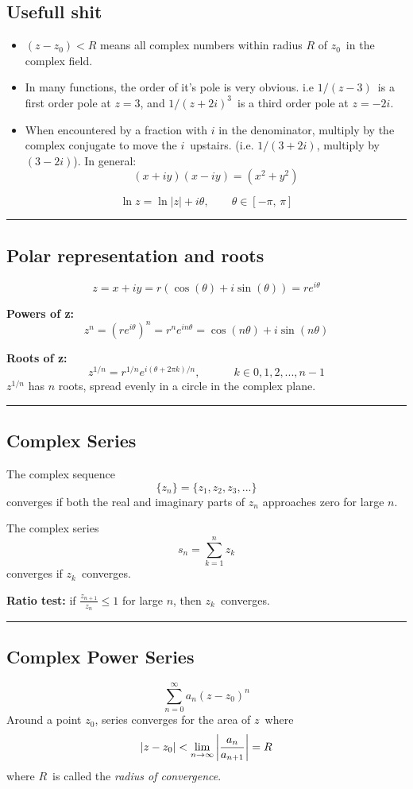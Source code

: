 \documentclass[10pt,a4paper]{article}
\renewcommand{\exp}{e^}
\newcommand{\holine}{\rule{286pt}{1pt}}
\begin{document}
\begin{multicols}{2}
\subsection*{Usefull shit}

\begin{itemize}
    \item $(z-z_0)<R$ means all complex numbers within radius $R$ of $z_0$ in the complex field.
    \item In many functions, the order of it's pole is very obvious. i.e $1/(z-3)$ is a first order pole at $z=3$, and $1/(z+2i)^3$ is a third order pole at $z=-2i$.
    \item When encountered by a fraction with $i$ in the denominator, multiply by the complex conjugate to move the $i$ upstairs. (i.e. $1/(3+2i)$, multiply by $(3-2i)$). In general:
    \[
        (x+iy)(x-iy) = (x^2 + y^2)
    \]
\end{itemize}

\[
    \ln{z} = \ln|z| + i\theta, \quad\quad \theta\in[-\pi,\, \pi]
\]



\holine
\subsection*{Polar representation and roots}
\[
    z = x + iy = r(\cos(\theta) + i\sin(\theta)) = r\exp{i\theta}
\]

\textbf{Powers of z:}
\[
    z^n = (r\exp{i\theta})^n = r^n\exp{in\theta} = \cos(n\theta) + i \sin(n\theta)
\]

\textbf{Roots of z:} 
\[
    z^{1/n} = r^{1/n}\exp{i(\theta + 2\pi k)/n}, \quad\quad\quad k\in 0,1,2,...,n-1
\]
$z^{1/n}$ has $n$ roots, spread evenly in a circle in the complex plane.



\holine
\subsection*{Complex Series}
The complex sequence
\[
    \{z_n\} = \{z_1, z_2, z_3, ...\}
\]
converges if both the real and imaginary parts of $z_n$ approaches zero for large $n$.

The complex series
\[
    s_n = \sum_{k=1}^n z_k
\]
converges if $z_k$ converges.

\textbf{Ratio test:}
if $\frac{z_{n+1}}{z_n} \leq 1$ for large $n$, then $z_k$ converges.


\holine
\subsection*{Complex Power Series}
\[
    \sum_{n=0}^\infty a_n(z-z_0)^n
\]
Around a point $z_0$, series converges for the area of $z$ where
\[
    |z-z_0| < \lim_{n\rightarrow\infty} \qty|\frac{a_n}{a_{n+1}}| = R
\]
where $R$ is called the \textit{radius of convergence}.



\end{multicols}
\end{document}

